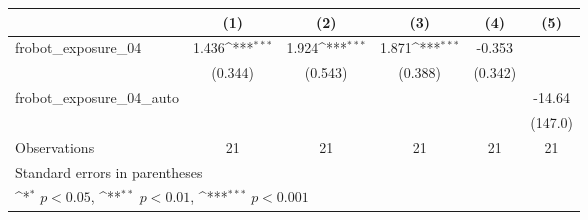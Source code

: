 {
\def\sym#1{\ifmmode^{#1}\else\(^{#1}\)\fi}
\begin{tabular}{l*{5}{c}}
\toprule
                    &\multicolumn{1}{c}{(1)}         &\multicolumn{1}{c}{(2)}         &\multicolumn{1}{c}{(3)}         &\multicolumn{1}{c}{(4)}         &\multicolumn{1}{c}{(5)}         \\
\midrule
frobot\_exposure\_04  &       1.436\sym{***}&       1.924\sym{***}&       1.871\sym{***}&      -0.353         &                     \\
                    &     (0.344)         &     (0.543)         &     (0.388)         &     (0.342)         &                     \\
\addlinespace
frobot\_exposure\_04\_auto&                     &                     &                     &                     &      -14.64         \\
                    &                     &                     &                     &                     &     (147.0)         \\
\midrule
Observations        &          21         &          21         &          21         &          21         &          21         \\
\bottomrule
\multicolumn{6}{l}{\footnotesize Standard errors in parentheses}\\
\multicolumn{6}{l}{\footnotesize \sym{*} \(p<0.05\), \sym{**} \(p<0.01\), \sym{***} \(p<0.001\)}\\
\end{tabular}
}
